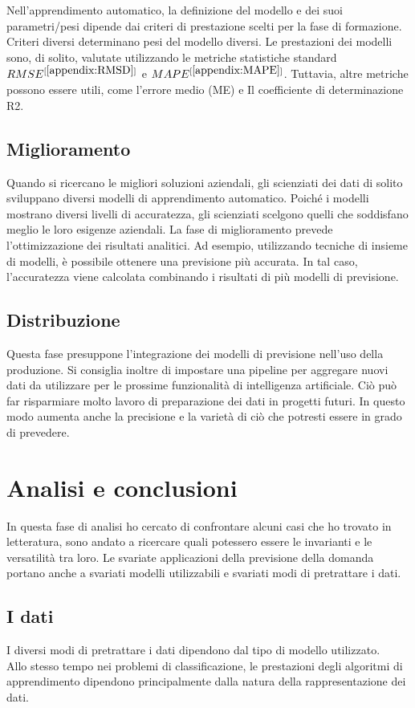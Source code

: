 \documentclass[12pt,a4paper]{report}
\begin{document}
Nell'apprendimento automatico, la definizione del modello e dei suoi parametri/pesi dipende dai criteri di prestazione scelti per la fase di formazione. Criteri diversi determinano pesi del modello diversi.
Le prestazioni dei modelli sono, di solito, valutate utilizzando le metriche statistiche standard $RMSE^{[\ref{appendix:RMSD}]}$ e $MAPE^{[\ref{appendix:MAPE}]}$. Tuttavia, altre metriche possono essere utili, come l'errore medio (ME) e Il coefficiente di determinazione R2.


\subsection{Miglioramento}
Quando si ricercano le migliori soluzioni aziendali, gli scienziati dei dati di solito sviluppano diversi modelli di apprendimento automatico. Poiché i modelli mostrano diversi livelli di accuratezza, gli scienziati scelgono quelli che soddisfano meglio le loro esigenze aziendali. La fase di miglioramento prevede l'ottimizzazione dei risultati analitici. Ad esempio, utilizzando tecniche di insieme di modelli, è possibile ottenere una previsione più accurata. In tal caso, l'accuratezza viene calcolata combinando i risultati di più modelli di previsione.


\subsection{Distribuzione}
Questa fase presuppone l'integrazione dei modelli di previsione nell'uso della produzione. Si consiglia inoltre di impostare una pipeline per aggregare nuovi dati da utilizzare per le prossime funzionalità di intelligenza artificiale. Ciò può far risparmiare molto lavoro di preparazione dei dati in progetti futuri. In questo modo aumenta anche la precisione e la varietà di ciò che potresti essere in grado di prevedere.


\section{Analisi e conclusioni}
In questa fase di analisi ho cercato di confrontare alcuni casi che ho trovato in letteratura, sono andato a ricercare quali potessero essere le invarianti e le versatilità tra loro.
Le svariate applicazioni della previsione della domanda portano anche a svariati modelli utilizzabili e svariati modi di pretrattare i dati.\\

\subsection{I dati}
I diversi modi di pretrattare i dati dipendono dal tipo di modello utilizzato.\\
Allo stesso tempo nei problemi di classificazione, le prestazioni degli algoritmi di apprendimento dipendono principalmente dalla natura della rappresentazione dei dati.\\
\end{document}
